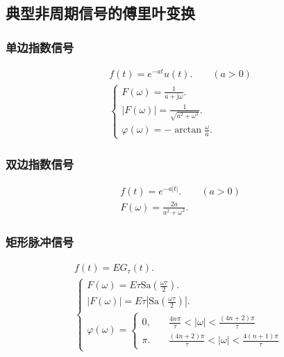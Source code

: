 \subsection{典型非周期信号的傅里叶变换} \label{3 典型非周期信号的傅里叶变换}
\subsubsection{单边指数信号}
\rmg\srmg
\begin{gather}
    f(t)=e^{-at}u(t).\qquad (a>0) \\
    \begin{cases}
        F(\omega)=\frac{1}{a+\mathrm{j}\omega}.    \\
        |F(\omega)|=\frac{1}{\sqrt{a^2+\omega^2}}. \\
        \varphi(\omega)=-\arctan\frac{\omega}{a}.
    \end{cases}
\end{gather}

\subsubsection{双边指数信号}
\rmg\srmg
\begin{gather}
    f(t)=e^{-a|t|}.\qquad (a>0) \\
    F(\omega)=\frac{2a}{a^2+\omega^2}.
\end{gather}

\subsubsection{矩形脉冲信号}
\rmg\srmg
\begin{gather}
    f(t)=EG_\tau(t). \\
    \begin{cases}
        F(\omega)=E\tau\mathrm{Sa}\left(\frac{\omega\tau}{2}\right).                \\
        |F(\omega)|=E\tau\left|\mathrm{Sa}\left(\frac{\omega\tau}{2}\right)\right|. \\
        \varphi(\omega)=\begin{cases}
                            0,\quad   & \frac{4n\pi}{\tau}<|\omega|<\frac{(4n+2)\pi}{\tau}     \\
                            \pi.\quad & \frac{(4n+2)\pi}{\tau}<|\omega|<\frac{4(n+1)\pi}{\tau}
                        \end{cases}
    \end{cases}
\end{gather}

